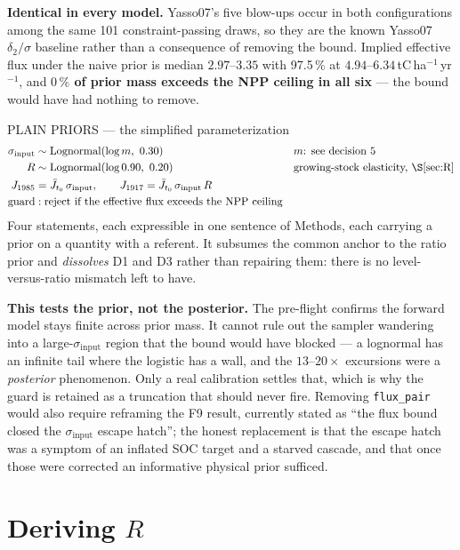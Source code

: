 \documentclass[11pt]{article}
\newcommand{\sinput}{\sigma_{\mathrm{input}}}
\newcommand{\Jto}{\bar{J}_{t_0}}
\begin{document}
\noindent \textbf{Identical in every model.} Yasso07's five blow-ups occur in both configurations
among the same 101 constraint-passing draws, so they are the known Yasso07 $\delta_2/\sigma$
baseline rather than a consequence of removing the bound. Implied effective flux under the naive
prior is median $2.97$--$3.35$ with 97.5\,\% at $4.94$--$6.34$\,tC\,ha$^{-1}$\,yr$^{-1}$, and
\textbf{$0\,\%$ of prior mass exceeds the NPP ceiling in all six} --- the bound would have had
nothing to remove.

\begin{proposal}{PLAIN PRIORS --- the simplified parameterization}
\begin{align*}
\sinput &\sim \mathrm{Lognormal}(\log m,\ 0.30) & &\text{$m$: see decision 5}\\
R &\sim \mathrm{Lognormal}(\log 0.90,\ 0.20) & &\text{growing-stock elasticity, \S\ref{sec:R}}\\
J_{1985} &= \Jto\,\sinput, \qquad J_{1917} = \Jto\,\sinput\,R\\
\text{guard} &: \text{reject if the effective flux exceeds the NPP ceiling}
\end{align*}
Four statements, each expressible in one sentence of Methods, each carrying a prior on a
quantity with a referent. It subsumes the common anchor to the ratio prior and \emph{dissolves} D1 and D3 rather than
repairing them: there is no level-versus-ratio mismatch left to have.
\end{proposal}

\begin{caveat}
\textbf{This tests the prior, not the posterior.} The pre-flight confirms the forward model stays
finite across prior mass. It cannot rule out the sampler wandering into a large-$\sinput$ region
that the bound would have blocked --- a lognormal has an infinite tail where the logistic has a
wall, and the $13$--$20\times$ excursions were a \emph{posterior} phenomenon. Only a real
calibration settles that, which is why the guard is retained as a truncation that should never
fire. Removing \texttt{flux\_pair} would also require reframing the F9 result, currently stated
as ``the flux bound closed the $\sinput$ escape hatch''; the honest replacement is that the
escape hatch was a symptom of an inflated SOC target and a starved cascade, and that once those
were corrected an informative physical prior sufficed.
\end{caveat}

\section{Deriving \texorpdfstring{$R$}{R}}\label{sec:R}
\end{document}
